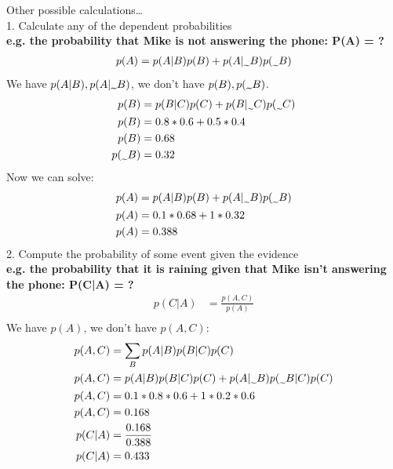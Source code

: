 \documentclass{article}
\newcommand{\midtilde}{\raisebox{-0.25\baselineskip}{\textasciitilde}}
\begin{document}
Other possible calculations…\\
1. Calculate any of the dependent probabilities\\
\textbf{e.g. the probability that Mike is not answering the phone: P(A) = ?} \\
\begin{align*}
    p(A) & = p(A|B)p(B) + p(A|\midtilde B) p(\midtilde B) \\
\end{align*}
We have $p(A|B), p(A|\midtilde B)$, we don't have $p(B), p(\midtilde B)$.
\begin{align*}
    p(B) & = p(B|C)p(C) + p(B|\midtilde C)p(\midtilde C) \\
    p(B) & = 0.8*0.6 + 0.5*0.4 \\
    p(B) & = 0.68 \\
    p(\midtilde B) & = 0.32 \\
\end{align*}
Now we can solve:
\begin{align*}
    p(A) & = p(A|B)p(B) + p(A|\midtilde B) p(\midtilde B) \\
    p(A) & = 0.1*0.68+1*0.32 \\
    p(A) & = 0.388 \\
\end{align*}
2. Compute the probability of some event given the evidence\\
\textbf{e.g. the probability that it is raining given that Mike isn’t answering the phone: P(C|A) = ?} \\
\begin{align*}
    p(C|A) & = \frac{p(A,C)}{p(A)} \\
\end{align*}
We have $p(A)$, we don't have $p(A,C)$:
\begin{align*}
    p(A,C) & = \sum_B p(A|B)p(B|C)p(C) \\
    p(A,C) & = p(A|B)p(B|C)p(C) + p(A|\midtilde B)p(\midtilde B|C)p(C) \\
    p(A,C) & = 0.1*0.8*0.6+1*0.2*0.6 \\
    p(A,C) & = 0.168 \\
    p(C|A) & = \frac{0.168}{0.388} \\
    p(C|A) & = 0.433 \\
\end{align*}
\end{document}
